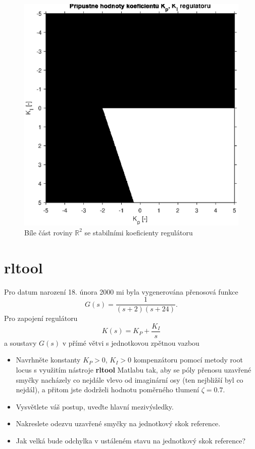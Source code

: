 \documentclass[twoside]{article}
\begin{document}
\begin{figure}
	\centering
	\includegraphics[width=0.8\linewidth]{stabilni_koeficienty.eps}
	\caption{Bíle část roviny $\mathbb{R}^2$ se stabilními koeficienty regulátoru}
	\label{fig:mozne_hodnoty}
\end{figure}

\section{rltool}

Pro datum narození 18. února 2000 mi byla vygenerována přenosová funkce
\begin{equation}
	G(s) = \frac{1}{(s+2)(s+24)}.
\end{equation}
Pro zapojení regulátoru 
\begin{equation}
	K(s) = K_P + \frac{K_I}{s}
\end{equation}
a soustavy $G(s)$ v přímé větvi s jednotkovou zpětnou vazbou
\begin{itemize}
	\item Navrhněte konstanty $K_P > 0$, $K_I > 0$ kompenzátoru pomocí metody root locus s využitím nástroje
	\textbf{rltool} Matlabu tak, aby se póly přenosu uzavřené smyčky nacházely co nejdále vlevo od
	imaginární osy (ten nejbližší byl co nejdál), a přitom jste dodrželi hodnotu poměrného tlumení
	$\zeta = 0.7$.
	\item Vysvětlete váš postup, uveďte hlavní mezivýsledky.
	\item Nakreslete odezvu uzavřené smyčky na jednotkový skok reference.
	\item Jak velká bude odchylka v ustáleném stavu na jednotkový skok reference? 
\end{itemize}
\end{document}
